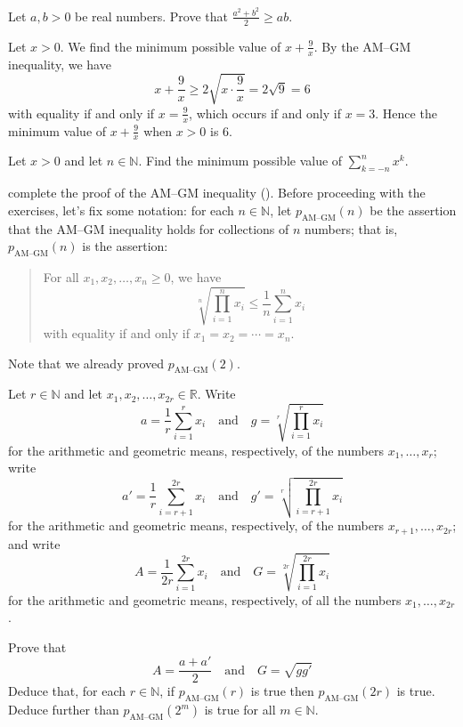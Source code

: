 \begin{exercise}
Let $a,b > 0$ be real numbers. Prove that $\displaystyle \frac{a^2+b^2}{2} \ge ab$.
\end{exercise}

\begin{example}
Let $x>0$. We find the minimum possible value of $x+\frac{9}{x}$. By the AM--GM inequality, we have
\[ x+\frac{9}{x} \ge 2\sqrt{x \cdot \frac{9}{x}} = 2 \sqrt{9} = 6 \]
with equality if and only if $x=\frac{9}{x}$, which occurs if and only if $x=3$. Hence the minimum value of $x+\frac{9}{x}$ when $x>0$ is $6$.
\end{example}

\begin{exercise}
Let $x>0$ and let $n \in \mathbb{N}$. Find the minimum possible value of $\displaystyle \sum_{k=-n}^n x^k$.
\end{exercise}

 complete the proof of the AM--GM inequality (). Before proceeding with the exercises, let's fix some notation: for each $n \in \mathbb{N}$, let $p_{\text{AM--GM}}(n)$ be the assertion that
the AM--GM inequality holds for collections of $n$ numbers; that is, $p_{\text{AM--GM}}(n)$ is the assertion:
\begin{quote}
For all $x_1,x_2,\dots,x_n \ge 0$, we have
\[ \sqrt[n]{\prod_{i=1}^n x_i} \le \frac{1}{n} \sum_{i=1}^n x_i \]
with equality if and only if $x_1=x_2=\cdots=x_n$.
\end{quote}
Note that we already proved $p_{\text{AM--GM}}(2)$.

\begin{exercise}
\label{exAMGMForPowersOf2}
Let $r \in \mathbb{N}$ and let $x_1,x_2,\dots,x_{2r} \in \mathbb{R}$. Write
\[ a = \frac{1}{r} \sum_{i=1}^r x_i \quad \text{and} \quad g = \sqrt[r]{\prod_{i=1}^r x_i} \]
for the arithmetic and geometric means, respectively, of the numbers $x_1,\dots,x_r$; write
\[ a' = \frac{1}{r} \sum_{i=r+1}^{2r} x_i \quad \text{and} \quad g' = \sqrt[r]{\prod_{i=r+1}^{2r} x_i} \]
for the arithmetic and geometric means, respectively, of the numbers $x_{r+1},\dots,x_{2r}$; and write
\[ A = \frac{1}{2r} \sum_{i=1}^{2r} x_i \quad \text{and} \quad G = \sqrt[2r]{\prod_{i=1}^{2r} x_i} \]
for the arithmetic and geometric means, respectively, of all the numbers $x_1,\dots,x_{2r}$.

Prove that
\[ A = \frac{a+a'}{2} \quad \text{and} \quad G=\sqrt{gg'} \]
Deduce that, for each $r \in \mathbb{N}$, if $p_{\text{AM--GM}}(r)$ is true then $p_{\text{AM--GM}}(2r)$ is true. Deduce further than $p_{\text{AM--GM}}(2^m)$ is true for all $m \in \mathbb{N}$.
\end{exercise}

